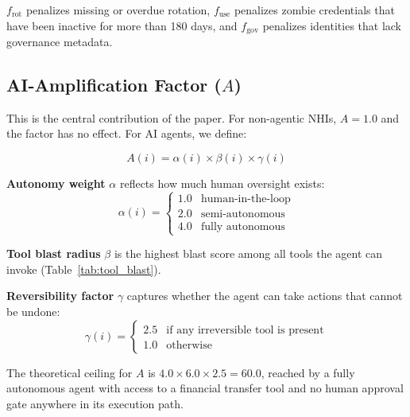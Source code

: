 \documentclass[conference]{IEEEtran}
\begin{document}
$f_{\text{rot}}$ penalizes missing or overdue rotation, $f_{\text{use}}$
penalizes zombie credentials that have been inactive for more than 180 days,
and $f_{\text{gov}}$ penalizes identities that lack governance metadata.

\subsection{AI-Amplification Factor ($A$)}

This is the central contribution of the paper. For non-agentic NHIs, $A = 1.0$
and the factor has no effect. For AI agents, we define:

\begin{equation}
  A(i) = \alpha(i) \times \beta(i) \times \gamma(i)
  \label{eq:amplification}
\end{equation}

\noindent\textbf{Autonomy weight} $\alpha$ reflects how much human oversight
exists:
\begin{equation}
  \alpha(i) = \begin{cases}
    1.0 & \text{human-in-the-loop} \\
    2.0 & \text{semi-autonomous} \\
    4.0 & \text{fully autonomous}
  \end{cases}
\end{equation}

\noindent\textbf{Tool blast radius} $\beta$ is the highest blast score among
all tools the agent can invoke (Table~\ref{tab:tool_blast}).

\noindent\textbf{Reversibility factor} $\gamma$ captures whether the agent
can take actions that cannot be undone:
\begin{equation}
  \gamma(i) = \begin{cases}
    2.5 & \text{if any irreversible tool is present} \\
    1.0 & \text{otherwise}
  \end{cases}
\end{equation}

The theoretical ceiling for $A$ is $4.0 \times 6.0 \times 2.5 = 60.0$,
reached by a fully autonomous agent with access to a financial transfer tool
and no human approval gate anywhere in its execution path.
\end{document}
